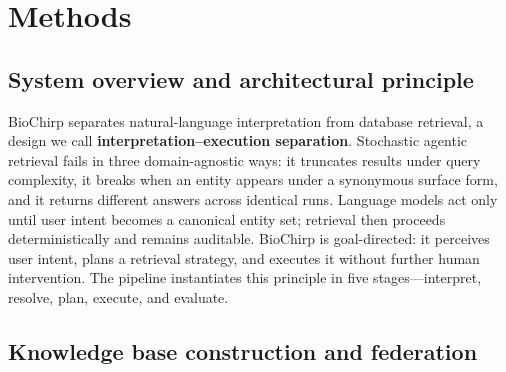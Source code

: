 
\section*{Methods}

\subsection*{System overview and architectural principle}

BioChirp separates natural-language interpretation from database retrieval, a design we call \textbf{interpretation--execution separation}. Stochastic agentic retrieval fails in three domain-agnostic ways: it truncates results under query complexity, it breaks when an entity appears under a synonymous surface form, and it returns different answers across identical runs. Language models act only until user intent becomes a canonical entity set; retrieval then proceeds deterministically and remains auditable. BioChirp is goal-directed: it perceives user intent, plans a retrieval strategy, and executes it without further human intervention. The pipeline instantiates this principle in five stages---interpret, resolve, plan, execute, and evaluate.

\subsection*{Knowledge base construction and federation}

